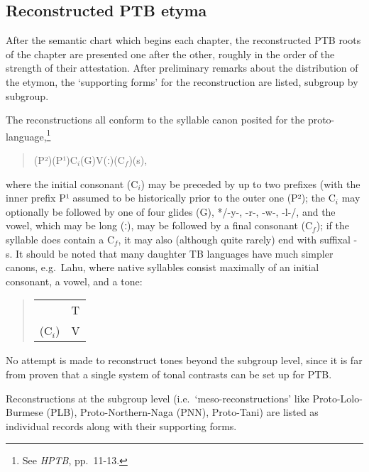 \subsection{Reconstructed PTB etyma}

After the semantic chart which begins each chapter, the reconstructed PTB
roots of the chapter are presented one after the other, roughly in the order of
the strength of their attestation.  After preliminary remarks about the
distribution of the etymon, the ‘supporting forms’ for the reconstruction are
listed, subgroup by subgroup.


The reconstructions all conform to the syllable canon posited for the
proto-language,\footnote{See \textit{HPTB}, pp.~11-13.}

\begin{quote}
(P²)\hspace{2em}(P¹)\hspace{2em}$\textrm{C}_i$\hspace{2em}(G)\hspace{2em}V\hspace{2em}(ː)\hspace{2em}($\textrm{C}_f$)\hspace{2em}(s),
\end{quote}


where the initial consonant ($\textrm{C}_i$) may be preceded by up to two prefixes (with the
inner prefix P¹ assumed to be historically prior to the outer one (P²); the $\textrm{C}_i$
may optionally be followed by one of four glides (G), */-y-, -r-, -w-, -l-/, and
the vowel, which may be long (ː), may be followed by a final consonant ($\textrm{C}_f$); if
the syllable does contain a $\textrm{C}_f$, it may also (although quite rarely) end with
suffixal -s.  It should be noted that many daughter TB languages have much
simpler canons, e.g.\ Lahu, where native syllables consist maximally of an
initial consonant, a vowel, and a tone:


\begin{quote}
\begin{tabular}{ll}
	&T\\
($\textrm{C}_i$)	&V\\
\end{tabular}
\end{quote}

No attempt is made to reconstruct tones beyond the subgroup level, since it is
far from proven that a single system of tonal contrasts can be set up for PTB.  


Reconstructions at the subgroup level (i.e.\ ‘meso-reconstructions’ like
Proto-Lolo-Burmese (PLB), Proto-Northern-Naga (PNN), Proto-Tani) are listed as
individual records along with their supporting forms.

